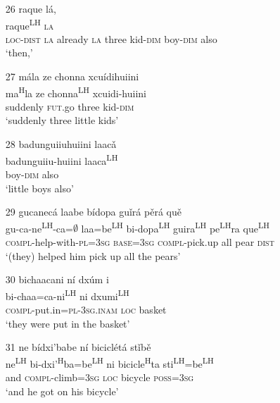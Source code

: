 \begin{itemize}
\item[26]
\glll raque l\'{a},\\
raque\textsuperscript{LH} \textsc{la}\\
\textsc{loc}-\textsc{dist} \textsc{la} already \textsc{la} { } three kid-\textsc{dim} boy-\textsc{dim} also\\
\glt `then,'


\item[27]
\glll m\'{a}la ze chonna xcu\'{i}dihuiini\\
ma\textsuperscript{H}la ze chonna\textsuperscript{LH} xcuidi-huiini\\
suddenly \textsc{fut}.go three kid-\textsc{dim}\\
\glt `suddenly three little kids'


\item[28]
\glll badunguiiuhuiini laac\v{a}\\
badunguiiu-huiini laaca\textsuperscript{LH}\\
boy-\textsc{dim} also\\
\glt `little boys also'


\item[29]
\glll gucanec\'{a} laabe b\'{i}dopa gu\v{i}r\'{a} p\v{e}r\'{a} qu\v{e}\\
gu-ca-ne\textsuperscript{LH}-ca=$\emptyset$ laa=be\textsuperscript{LH} bi-dopa\textsuperscript{LH} guira\textsuperscript{LH} pe\textsuperscript{LH}ra que\textsuperscript{LH}\\
\textsc{compl}-help-with-\textsc{pl}=\textsc{3sg} \textsc{base}=\textsc{3sg} \textsc{compl}-pick.up all pear \textsc{dist}\\
\glt `(they) helped him pick up all the pears'
 

\item[30]
\glll bichaacani n\'{i} dx\'{u}m\v{ i}\\
bi-chaa=ca-ni\textsuperscript{LH} ni dxumi\textsuperscript{LH}\\
\textsc{compl}-put.in=\textsc{pl}-\textsc{3sg.inam} \textsc{loc} basket\\
\glt `they were put in the basket'
 

\item[31]
\glll ne b\'{i}dxi'babe n\'{i} bicicl\'{e}t\'{a} st\v{i}b\v{e}\\
ne\textsuperscript{LH} bi-dxi'\textsuperscript{H}ba=be\textsuperscript{LH} ni bicicle\textsuperscript{H}ta sti\textsuperscript{LH}=be\textsuperscript{LH}\\
and \textsc{compl}-climb=\textsc{3sg} \textsc{loc} bicycle \textsc{poss}=\textsc{3sg}\\
\glt `and he got on his bicycle'



\end{itemize}
